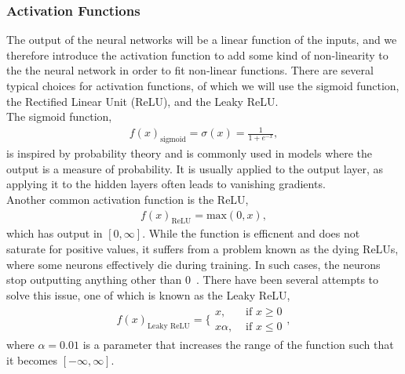 \documentclass[english,notitlepage,reprint,nofootinbib]{revtex4-2}  %
\begin{document}
\subsubsection*{Activation Functions}%
The output of the neural networks will be a linear function of the inputs, and we therefore introduce the activation function to add some kind of non-linearity to the the neural network in order to fit non-linear functions. 
There are several typical choices for activation functions, of which we will use the sigmoid function, the Rectified Linear Unit (ReLU), and the Leaky ReLU. 
\vspace{3mm}
\\ 
The sigmoid function, 
\begin{align}
    f(x)_\text{sigmoid} = \sigma(x) = \frac{1}{1+e^{−x}},
\end{align}
is inspired by probability theory and is commonly used in models where the output is a measure of probability. It is usually applied to the output layer, as applying it to the hidden layers often leads to vanishing gradients. 
\vspace{3mm}
\\ 
Another common activation function is the ReLU, 
\begin{align}
    f(x)_\text{ReLU} = \text{max}(0, x), 
\end{align}
which has output in $[0,\infty]$. 
While the function is efficnent and does not saturate for positive values, it suffers from a problem known as the dying ReLUs, where some neurons effectively die during training. In such cases, the neurons stop outputting anything other than 0~\cite{lecture_notes}. There have been several attempts to solve this issue, one of which is known as the Leaky ReLU, 
\begin{align}
    f(x)_\text{Leaky ReLU} = \bigg\{ 
    \begin{matrix}
        x,       & \text{ if } x \geq 0 \\ 
        x\alpha, & \text{ if } x \leq 0 
    \end{matrix}, 
\end{align}
where $\alpha=0.01$ is a parameter that increases the range of the function such that it becomes $[-\infty, \infty]$. 
\end{document}
